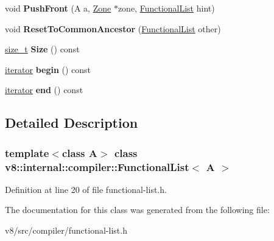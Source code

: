 \begin{DoxyCompactItemize}
void {\bfseries Push\+Front} (A a, \mbox{\hyperlink{classv8_1_1internal_1_1Zone}{Zone}} $\ast$zone, \mbox{\hyperlink{classv8_1_1internal_1_1compiler_1_1FunctionalList}{Functional\+List}} hint)
\item 
\mbox{\label{classv8_1_1internal_1_1compiler_1_1FunctionalList_ac36536a8587217debecd9eff184192f4}} 
void {\bfseries Reset\+To\+Common\+Ancestor} (\mbox{\hyperlink{classv8_1_1internal_1_1compiler_1_1FunctionalList}{Functional\+List}} other)
\item 
\mbox{\label{classv8_1_1internal_1_1compiler_1_1FunctionalList_afe35894ff618119e1c1925951323e497}} 
\mbox{\hyperlink{classsize__t}{size\+\_\+t}} {\bfseries Size} () const
\item 
\mbox{\label{classv8_1_1internal_1_1compiler_1_1FunctionalList_a5db503b74ec2b284c00f0aa36382cda4}} 
\mbox{\hyperlink{classv8_1_1internal_1_1compiler_1_1FunctionalList_1_1iterator}{iterator}} {\bfseries begin} () const
\item 
\mbox{\label{classv8_1_1internal_1_1compiler_1_1FunctionalList_a4fbbd37c4c88324fd63e06e862daf0d5}} 
\mbox{\hyperlink{classv8_1_1internal_1_1compiler_1_1FunctionalList_1_1iterator}{iterator}} {\bfseries end} () const
\end{DoxyCompactItemize}


\subsection{Detailed Description}
\subsubsection*{template$<$class A$>$\newline
class v8\+::internal\+::compiler\+::\+Functional\+List$<$ A $>$}



Definition at line 20 of file functional-\/list.\+h.



The documentation for this class was generated from the following file\+:\begin{DoxyCompactItemize}
\item 
v8/src/compiler/functional-\/list.\+h\end{DoxyCompactItemize}
